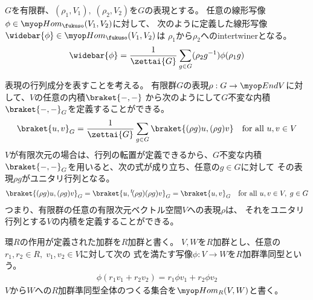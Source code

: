 	\begin{proposition}[intertwinerの作り方]\label{prop:intertwinerの作り方} %
		$G$を有限群、$(\rho_1,V_1),\;(\rho_2,V_2)$を$G$の表現とする。
		任意の線形写像$\phi\in\Hom_\fukuso(V_1,V_2)$に対して、
		次のように定義した線形写像$\widebar{\phi}\in\Hom_\fukuso(V_1,V_2)$は
		$\rho_1$から$\rho_2$へのintertwinerとなる。
		\begin{equation*}\begin{split} %
			\widebar{\phi} = \frac{1}{\zettai{G}}\sum_{g\in G}
				(\rho_2 g^{-1})\phi(\rho_1 g)
		\end{split}\end{equation*} %
	\end{proposition} %
	
	表現の行列成分を表すことを考える。
	有限群$G$の表現$\rho:G\to \End V$に対して、$V$の任意の内積$\braket{-,-}$
	から次のようにして$G$不変な内積$\braket{-,-}_G$を定義することができる。
	\begin{equation*}\begin{split} %
		\braket{u,v}_G = \frac{1}{\zettai{G}}\sum_{g\in G}
			\braket{(\rho g)u, (\rho g)v} \quad\text{for all }u,v\in V
	\end{split}\end{equation*} %
	$V$が有限次元の場合は、行列の転置が定義できるから、$G$不変な内積
	$\braket{-,-}_G$を用いると、次の式が成り立ち、任意の$g\in G$に対して
	その表現$\rho g$がユニタリ行列となる。
	\begin{equation*}\begin{split} %
		\braket{(\rho g)u,(\rho g)v}_G 
		= \braket{u,\lu{t}{(\rho g)}(\rho g)v}_G
		= \braket{u,v}_G \quad\text{for all }u,v\in V,\;g\in G
	\end{split}\end{equation*} %
	つまり、有限群の任意の有限次元ベクトル空間$V$への表現$\rho$は、
	それをユニタリ行列とする$V$の内積を定義することができる。

	\begin{todo}[ここまで]\label{todo:ここまで} %
	\end{todo} %

	環$R$の作用が定義された加群を$R$加群と書く。
	$V,W$を$R$加群とし、任意の$r_1,r_2\in R,\;v_1,v_2\in V$に対して次の
	式を満たす写像$\phi:V\to W$を$R$加群準同型という。
	\begin{equation*}\begin{split} %
		\phi(r_1v_1+r_2v_2) = r_1\phi v_1 + r_2\phi v_2
	\end{split}\end{equation*} %
	$V$から$W$への$R$加群準同型全体のつくる集合を$\Hom_R(V,W)$と書く。

